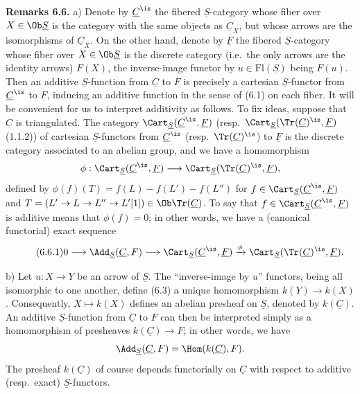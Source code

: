 \textbf{Remarks 6.6.} a) Denote by \(\underline{C}^{\is}\) the fibered \(\underline{S}\)-category whose fiber over \(X\in\Ob \underline{S}\) is the category with the same objects as \(\underline{C}_X\), but whose arrows are the isomorphisms of \(\underline{C}_X\). On the other hand, denote by \(\underline F\) the fibered \(\underline{S}\)-category whose fiber over \(X\in\Ob \underline{S}\) is the discrete category (i.e.\ the only arrows are the identity arrows) \(F(X)\), the inverse-image functor by \(u\in\mathrm{Fl}(\underline{S})\) being \(F(u)\). Then an additive \(\underline{S}\)-function from \(\underline{C}\) to \(F\) is precisely a cartesian \(\underline{S}\)-functor from \(\underline{C}^{\is}\) to \(\underline F\), inducing an additive function in the sense of (6.1) on each fiber. It will be convenient for us to interpret additivity as follows. To fix ideas, suppose that \(\underline{C}\) is triangulated. The category \(\Cart_{\underline{S}}(\underline{C}^{\is},\underline F)\) (resp.\ \(\Cart_{\underline{S}}(\Tr(\underline{C})^{\is},\underline F)\) (1.1.2)) of cartesian \(\underline{S}\)-functors from \(\underline{C}^{\is}\) (resp.\ \(\Tr(\underline{C})^{\is}\)) to \(\underline F\) is the discrete category associated to an abelian
%
group, and we have a homomorphism
\[
  \phi:\Cart_{\underline{S}}(\underline{C}^{\is},\underline F)
  \longrightarrow
  \Cart_{\underline{S}}(\Tr(\underline{C})^{\is},\underline F),
\]
defined by \(\phi(f)(T)=f(L)-f(L')-f(L'')\) for \(f\in\Cart_{\underline{S}}(\underline{C}^{\is},\underline F)\) and \(T=(L'\to L\to L''\to L'[1])\in\Ob\Tr(\underline{C})\). To say that \(f\in\Cart_{\underline{S}}(\underline{C}^{\is},\underline F)\) is additive means that \(\phi(f)=0\); in other words, we have a (canonical functorial) exact sequence
\begin{equation}\tag{6.6.1}
  0\longrightarrow \Add_{\underline{S}}(\underline{C},F)
  \longrightarrow \Cart_{\underline{S}}(\underline{C}^{\is},\underline F)
  \xrightarrow{\phi}
  \Cart_{\underline{S}}(\Tr(\underline{C})^{\is},\underline F).
\end{equation}

b) Let \(u:X\to Y\) be an arrow of \(\underline{S}\). The ``inverse-image by \(u\)'' functors, being all isomorphic to one another, define (6.3) a unique homomorphism \(k(Y)\longrightarrow k(X)\). Consequently, \(X\mapsto k(X)\) defines an abelian presheaf on \(\underline{S}\), denoted by \(k(\underline{C})\). An additive \(\underline{S}\)-function from \(\underline{C}\) to \(F\) can then be interpreted simply as a homomorphism of presheaves \(k(\underline{C})\longrightarrow F\); in other words, we have
\[
  \Add_{\underline{S}}(\underline{C},F)=\Hom(k(\underline{C}),F).
\]
The presheaf \(k(\underline{C})\) of course depends functorially on \(\underline{C}\) with respect to additive (resp.\ exact) \(\underline{S}\)-functors.

